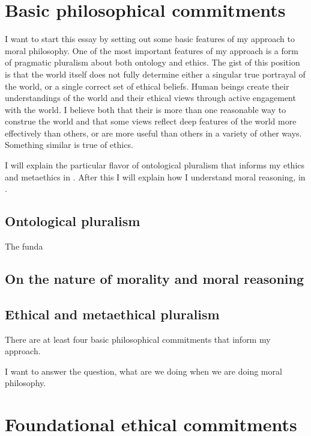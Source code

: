 \chapter{Basic philosophical commitments}
\label{sec:org696364a}
I want to start this essay by setting out some basic features of my approach to
moral philosophy.
One of the most important features of my approach is a form of pragmatic pluralism
about both ontology and ethics.
 The gist of this position is that the world itself does not fully determine
either a singular true portrayal of the world, or a single correct set of ethical
beliefs.
Human beings create their understandings of the world and their ethical views
through active engagement with the world.
I believe both that their is more than one reasonable way to construe the world
and that some views reflect deep features of the world more effectively than
others, or are more useful than others in a variety of other ways.
Something similar is true of ethics.

I will explain the particular flavor of ontological pluralism that informs my
ethics and metaethics in .
After this I will explain how I understand moral reasoning, in
.
\section{Ontological pluralism}
\label{sec:ont_plural}
The funda
\section{On the nature of morality and moral reasoning}
\label{sec:nat_mor}
\section{Ethical and metaethical pluralism}
\label{sec:eth_plural}
There are at least four basic philosophical commitments that inform my approach.

I want to answer the question, what are we doing when we are doing moral
philosophy.
\chapter{Foundational ethical commitments}
\label{ch:eth_com}
